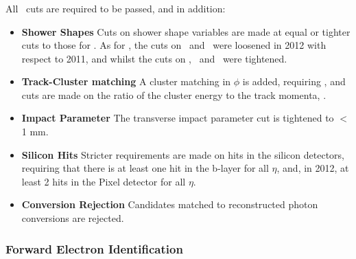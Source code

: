 \subsubsection{\tightPP}


All \mediumPP\ cuts are required to be passed, and in addition:

\begin{itemize}
    \item {\bf Shower Shapes} Cuts on shower shape variables are made at equal
    or tighter cuts to those for \mediumPP. As for \mediumPP,
    the cuts on \Reta\ and \Rhad\ were loosened in 2012 with respect to 2011, and
    whilst the cuts on  \wetatwo, \Eratio\ and
    \wstot\ were tightened.

    \item {\bf Track-Cluster matching} A cluster matching in $\phi$ is added,
    requiring , and cuts are made on the ratio of the cluster
    energy to the track momenta, \Eoverp.

    \item {\bf Impact Parameter} The
    transverse impact parameter cut is tightened to \dzero $<$ 1 mm.

    \item {\bf Silicon Hits} Stricter requirements are made on hits in the
    silicon detectors, requiring that there is at least one hit in the b-layer for
    all $\eta$, and, in 2012, at least 2 hits in the Pixel detector for all
    $\eta$.

    \item {\bf Conversion Rejection} Candidates matched to reconstructed photon
    conversions are rejected.

\end{itemize}

\subsubsection{Forward Electron Identification}

